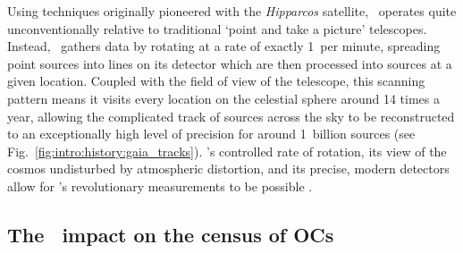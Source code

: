 Using techniques originally pioneered with the \emph{Hipparcos} satellite, \gaia\ operates quite unconventionally relative to traditional `point and take a picture' telescopes. Instead, \gaia\ gathers data by rotating at a rate of exactly 1\textdegree\ per minute, spreading point sources into lines on its detector which are then processed into sources at a given location. Coupled with the field of view of the telescope, this scanning pattern means it visits every location on the celestial sphere around 14 times a year, allowing the complicated track of sources across the sky to be reconstructed to an exceptionally high level of precision for around 1~billion sources (see Fig.~\ref{fig:intro:history:gaia_tracks}). \gaia's controlled rate of rotation, its view of the cosmos undisturbed by atmospheric distortion, and its precise, modern detectors allow for \gaia's revolutionary measurements to be possible \citep{gaia_collaboration_gaia_2016}.


\subsection{The \gaia\ impact on the census of OCs}
\label{sec:intro:gaia:census}

